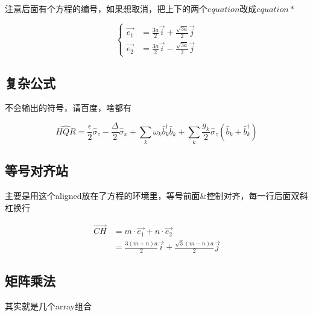 \documentclass[AutoFakeBold]{LZUThesis}
\begin{document}
注意后面有个方程的编号，如果想取消，把上下的两个$equation$改成$equation*$

\begin{equation*}
    \left\{
    \begin{array}{rcl}
        \vec{e_1} &= \frac{3a}{2} \vec{i} + \frac{\sqrt{3a}}{2} \vec{j} \\
        \vec{e_2} &= \frac{3a}{2} \vec{i} - \frac{\sqrt{3a}}{2} \vec{j}
    \end{array}
    \right.
    \label{e1e2_2}
\end{equation*}


\subsection{复杂公式} %
\label{sub:复杂公式}
不会输出的符号，请百度，啥都有

\begin{equation}
\hat{HQR}=\frac{\epsilon}{2}\hat{\sigma}_{z}-\frac{\Delta}{2}\hat{\sigma}_{x}+\sum_{k}\omega_{k}\hat{b}_{k}^{\dagger}\hat{b}_{k}+\sum_{k}\frac{g_{k}}{2}\hat{\sigma}_{z}(\hat{b}_{k}+\hat{b}_{k}^{\dagger})\label{eq:sbm}
\end{equation}



\subsection{等号对齐站} %
\label{sub:等号对齐站}

主要是用这个aligned放在了方程的环境里，等号前面\&控制对齐，每一行后面双斜杠换行

\begin{equation}
    \begin{aligned}
        \vec{CH} & = m\cdot \vec{e_1} + n\cdot \vec{e_2} \\
        & = \frac{3(m+n)a}{2} \vec{i} + \frac{\sqrt{3}(m-n)a}{2} \vec{j} 
    \end{aligned}
    \label{ch}
\end{equation}


\subsection{矩阵乘法} %
\label{sub:矩阵乘法}

其实就是几个array组合
\end{document}
